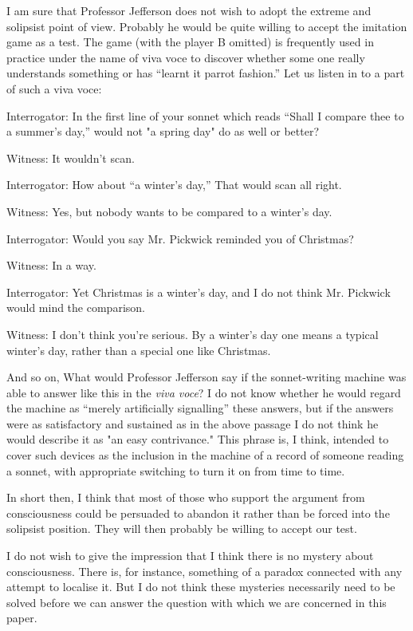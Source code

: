 \documentclass[10pt,twoside,openright]{memoir}
\begin{document}
I am sure that Professor Jefferson does not wish to adopt the extreme and solipsist point of view. Probably he would be quite willing to accept the imitation game as a test. The game (with the player B omitted) is frequently used in practice under the name of viva voce to discover whether some one really understands something or has ``learnt it parrot fashion.'' Let us listen in to a part of such a viva voce:

Interrogator: In the first line of your sonnet which reads ``Shall I compare thee to a summer's day,'' would not "a spring day" do as well or better?

Witness: It wouldn't scan.

Interrogator: How about ``a winter's day,'' That would scan all right.

Witness: Yes, but nobody wants to be compared to a winter's day.

Interrogator: Would you say Mr. Pickwick reminded you of Christmas?

Witness: In a way.

Interrogator: Yet Christmas is a winter's day, and I do not think Mr. Pickwick would mind the comparison.

Witness: I don't think you're serious. By a winter's day one means a typical winter's day, rather than a special one like Christmas.

And so on, What would Professor Jefferson say if the sonnet-writing machine was able to answer like this in the \emph{viva voce}? I do not know whether he would regard the machine as ``merely artificially signalling'' these answers, but if the answers were as satisfactory and sustained as in the above passage I do not think he would describe it as "an easy contrivance." This phrase is, I think, intended to cover such devices as the inclusion in the machine of a record of someone reading a sonnet, with appropriate switching to turn it on from time to time.

In short then, I think that most of those who support the argument from consciousness could be persuaded to abandon it rather than be forced into the solipsist position. They will then probably be willing to accept our test.

I do not wish to give the impression that I think there is no mystery about consciousness. There is, for instance, something of a paradox connected with any attempt to localise it. But I do not think these mysteries necessarily need to be solved before we can answer the question with which we are concerned in this paper.
\end{document}
